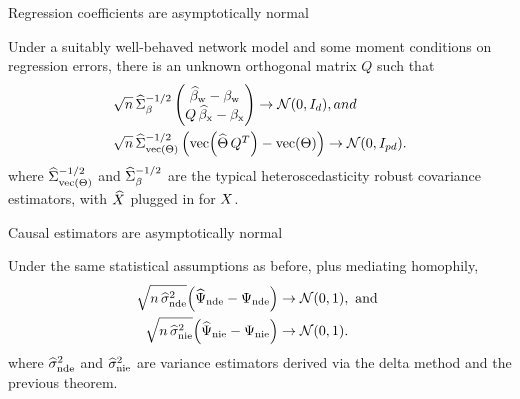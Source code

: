 \documentclass[aspectratio=169]{beamer}
\theoremstyle{remark}
\begin{document}
\begin{frame}{Regression coefficients are asymptotically normal}

    \begin{theorem}

        \vspace{2mm}

        Under a suitably well-behaved network model and some moment conditions on regression errors, there is an unknown orthogonal matrix $Q$ such that
        \begin{equation*}
            \begin{aligned}
                \sqrt{ n } \,
                 & \Sigmahatbeta^{-1/2}
                \begin{pmatrix}
                    \betawhat - \betaw \\
                    Q \, \betaxhat - \betax
                \end{pmatrix}
                \to
                \Normal{0}{I_d}, and     \\
                \sqrt{ n } \,
                 & \Sigmahattheta^{-1/2}
                \begin{pmatrix}
                    \vecc \paren*{\Thetahat \, Q^T} - \Thetavec
                \end{pmatrix}
                \to
                \Normal{0}{I_{p d}}.
            \end{aligned}
        \end{equation*}
        \noindent where $\widehat{\Sigma}_{\operatorname*{vec} \left(\Theta\right)}^{-1/2}$ and $\widehat{\Sigma}_\beta^{-1/2}$ are the typical heteroscedasticity robust covariance estimators, with $\widehat{X}$ plugged in for $X$.
    \end{theorem}
\end{frame}

\begin{frame}{Causal estimators are asymptotically normal}

    \begin{theorem}
        \vspace{2mm}

        Under the same statistical assumptions as before, plus mediating homophily,
        \begin{align*}
            \sqrt{n \, \sigmahatnde} \paren*{\ndehat - \nde}
             & \to
            \Normal{0}{1}, \text { and } \\
            \sqrt{n \, \sigmahatnie} \paren*{\niehat - \nie}
             & \to
            \Normal{0}{1}.
        \end{align*}
        \noindent where $\widehat{\sigma}^2_\mathrm{nde}$ and $\widehat{\sigma}^2_\mathrm{nie}$ are variance estimators derived via the delta method and the previous theorem.

    \end{theorem}

\end{frame}
\end{document}
